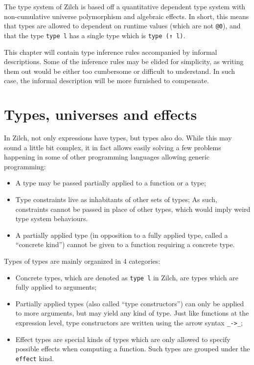 The type system of Zilch is based off a quantitative dependent type system with non-cumulative universe polymorphism and algebraic effects.
In short, this means that types are allowed to dependent on runtime values (which are not \texttt{@0}), and that the type \texttt{type l} has a single type which is \texttt{type (↑ l)}.

This chapter will contain type inference rules accompanied by informal descriptions.
Some of the inference rules may be elided for simplicity, as writing them out would be either too cumbersome or difficult to understand.
In such case, the informal description will be more furnished to compensate.

\section{Types, universes and effects}\label{sec:zilch-staticsem-types}

In Zilch, not only expressions have types, but types also do.
While this may sound a little bit complex, it in fact allows easily solving a few problems happening in some of other programming languages allowing generic programming:
\begin{itemize}
	\item A type may be passed partially applied to a function or a type;
	\item Type constraints live as inhabitants of other sets of types;
	      As such, constraints cannot be passed in place of other types, which would imply weird type system behaviours.
	\item A partially applied type (in opposition to a fully applied type, called a ``concrete kind'') cannot be given to a function requiring a concrete type.
\end{itemize}

Types of types are mainly organized in 4 categories:
\begin{itemize}
	\item Concrete types, which are denoted as \verb|type l| in Zilch, are types which are fully applied to arguments;
	\item Partially applied types (also called ``type constructors'') can only be applied to more arguments, but may yield any kind of type.
	      Just like functions at the expression level, type constructors are written using the arrow syntax \verb|_->_|;
	\item Effect types are special kinds of types which are only allowed to specify possible effects when computing a function.
	      Such types are grouped under the \verb|effect| kind.
\end{itemize}

